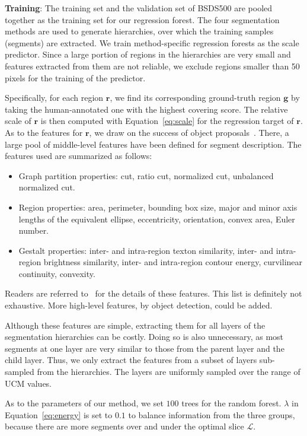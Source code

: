 \textbf{Training}: The training set and the validation set of BSDS500
are pooled together as the training set for our regression forest. The
four segmentation methods are used to generate hierarchies,
over which the training samples (segments) are extracted.
We train method-specific regression forests
as the scale predictor.
Since a large portion of regions in the hierarchies are very small and
features extracted from them are not reliable, we exclude regions smaller
than 50 pixels for the training of the predictor.

Specifically, for each region $\mathbf{r}$, we find its corresponding
ground-truth region $\mathbf{g}$ by taking the human-annotated one with the
highest covering score. 
The relative scale of $\mathbf{r}$ is then computed with
Equation~\ref{eq:scale} for the regression target of $\mathbf{r}$.
As to the features for $\mathbf{r}$, we draw on the
success of object proposals~\cite{carreira2010constrained,arbelaez2014multiscale}.
There, a large pool of middle-level features have been defined for segment description.
The features used are summarized as follows:
\begin{itemize}
\item Graph partition properties: cut, ratio cut, normalized cut, unbalanced normalized cut. 
\item Region properties:  area, perimeter, bounding box size, major and minor axis lengths of the equivalent ellipse, eccentricity, orientation, convex area, Euler number.
\item Gestalt properties: inter- and intra-region texton similarity, inter- and intra-region brightness similarity, inter- and intra-region contour energy, curvilinear continuity, convexity.
\end{itemize}
Readers are referred to~\cite{carreira2010constrained} for the details
of these features. This list is definitely not exhaustive.
More high-level features, \eg by object detection, could be added.

Although these features are simple, extracting them for all layers of
the segmentation hierarchies can be costly.
Doing so is also unnecessary, as most segments at one layer are very
similar to those from the parent layer and the child layer.
Thus, we only extract the features from a subset of layers
sub-sampled from the hierarchies.
The layers are uniformly sampled over the range of UCM values. 

As to the parameters of our method, we set $100$ trees for the random
forest. $\lambda$ in Equation~\ref{eq:energy} is set to $0.1$ to
balance information from the three groups, because there are more
segments over and under the optimal slice $\mathcal{L}$. %

